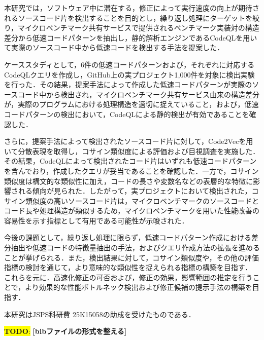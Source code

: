 \documentclass[submit,techrep,noauthor]{ipsj}
\newcommand{\todo}[1]{\colorbox{yellow}{{\bf TODO}:}{\color{red} {\textbf{[#1]}}}}
\begin{document}
本研究では，ソフトウェア中に潜在する，修正によって実行速度の向上が期待されるソースコード片を検出することを目的とし，繰り返し処理にターゲットを絞り，マイクロベンチマーク共有サービスで提供されるベンチマーク実装対の構造差分から低速コードパターンを抽出し，静的解析エンジンであるCodeQLを用いて実際のソースコード中から低速コードを検出する手法を提案した．

ケーススタディとして，6件の低速コードパターンおよび，それぞれに対応するCodeQLクエリを作成し，GitHub上の実プロジェクト1,000件を対象に検出実験を行った．その結果，提案手法によって作成した低速コードパターンが実際のソースコード中から検出され，マイクロベンチマーク共有サービス由来の構造差分が，実際のプログラムにおける処理構造を適切に捉えていること，および，低速コードパターンの検出において，CodeQLによる静的検出が有効であることを確認した．

さらに，提案手法によって検出されたソースコード片に対して，Code2Vecを用いて分散表現を取得し，コサイン類似度による評価および目視調査を実施した．その結果，CodeQLによって検出されたコード片はいずれも低速コードパターンを含んでおり，作成したクエリが妥当であることを確認した．一方で，コサイン類似度は構文的な類似性に加え，コードの長さや変数名などの表層的な特徴に影響される傾向が見られた．したがって，実プロジェクトにおいて検出された，コサイン類似度の高いソースコード片は，マイクロベンチマークのソースコードとコード長や処理構造が類似するため，マイクロベンチマークを用いた性能改善の容易性を示す指標として有用である可能性が示唆された．

今後の課題として，繰り返し処理に限らず，低速コードパターン作成における差分抽出や低速コードの特徴量抽出の手法，およびクエリ作成方法の拡張を進めることが挙げられる．また，検出結果に対して，コサイン類似度や，その他の評価指標の検討を通じて，より意味的な類似性を捉えられる指標の構築を目指す．
これらを元に．高速化修正の可否および，修正の効果，影響範囲の推定を行うことで，より効果的な性能ボトルネック検出および修正候補の提示手法の構築を目指す．

\begin{acknowledgment}
本研究はJSPS科研費 25K15058の助成を受けたものである．
\end{acknowledgment}


\todo{bibファイルの形式を整える}


\end{document}
